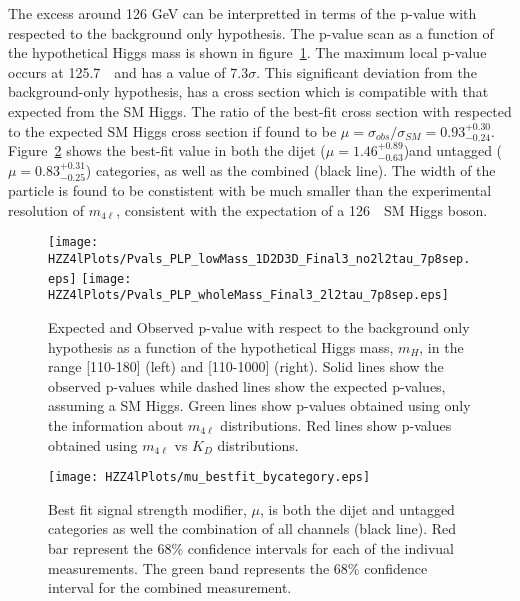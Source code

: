 The excess around 126 GeV can be interpretted in terms of the 
p-value with respected to the background only hypothesis.  
The p-value scan as a function of the hypothetical Higgs mass
is shown in figure~\ref{fig:HZZ4lPvalues}.  The maximum local 
p-value 
occurs at 125.7~\GeV~and has a value of $7.3\sigma$.  This 
significant deviation from the background-only hypothesis, has 
a cross section which is compatible 
with that expected from the SM Higgs.  The ratio of the best-fit
cross section with respected to the expected SM Higgs cross
section if found to be $\mu=\sigma_{obs}/\sigma_{SM}=0.93^{+0.30}_{-0.24}$.  Figure~\ref{fig:HZZ4lfittedMu} shows the best-fit value
in both the dijet ($\mu=1.46^{+0.89}_{-0.63}$)and untagged ($\mu=0.83^{+0.31}_{-0.25}$) categories, as well as the combined
(black line).  The width of the particle is found to be 
constistent with be much smaller than the experimental resolution
of $m_{4\ell}$, consistent with the expectation of a 126~\GeV~SM 
Higgs boson.

\begin{figure}
\begin{center}
\texttt{[image: HZZ4lPlots/Pvals\_PLP\_lowMass\_1D2D3D\_Final3\_no2l2tau\_7p8sep.eps]}
\texttt{[image: HZZ4lPlots/Pvals\_PLP\_wholeMass\_Final3\_2l2tau\_7p8sep.eps]}
\caption{Expected and Observed p-value with respect to the
background only hypothesis as a function of the hypothetical 
Higgs mass, $m_H$, in the range [110-180] (left) and 
[110-1000] (right).  Solid lines show the observed p-values
while dashed lines show the expected p-values, assuming a 
SM Higgs.  Green lines show p-values obtained using only
the information about $m_{4\ell}$ distributions. Red
lines show p-values obtained using $m_{4\ell}$ vs $K_D$
distributions. }
\label{fig:HZZ4lPvalues}
\end{center}
\end{figure}

\begin{figure}
\begin{center}
\hspace{-3.5cm}
\vspace{-0.0cm}
\texttt{[image: HZZ4lPlots/mu\_bestfit\_bycategory.eps]}
\caption{Best fit signal strength modifier, $\mu$, is both the 
dijet and untagged categories as well the combination of all 
channels (black line).  Red bar represent the 68\% confidence 
intervals for each of the indivual measurements.  The 
green band represents the 68\% confidence interval for the
combined measurement.}
\label{fig:HZZ4lfittedMu}
\end{center}
\end{figure}



